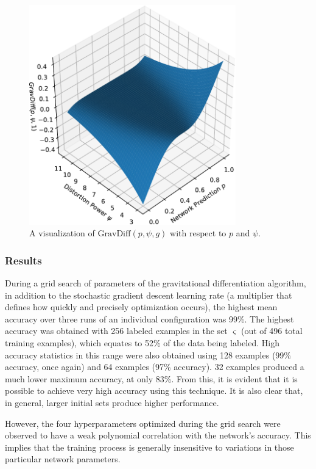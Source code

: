 \documentclass[10pt]{article}
\begin{document}
\begin{figure}[H]
    \centering
    \includegraphics[width=0.8\textwidth]{grav_diff}
    \caption{\label{grav_diff} A visualization of $\mathrm{GravDiff}(p, \psi, g)$ with respect to $p$ and $\psi$.}
\end{figure}

\subsubsection{Results}

During a grid search of parameters of the gravitational differentiation algorithm, in addition to the stochastic gradient descent learning rate (a multiplier that defines how quickly and precisely optimization occurs), the highest mean accuracy over three runs of an individual configuration was 99\%. The highest accuracy was obtained with 256 labeled examples in the set $\varsigma$ (out of 496 total training examples), which equates to 52\% of the data being labeled. High accuracy statistics in this range were also obtained using 128 examples (99\% accuracy, once again) and 64 examples (97\% accuracy). 32 examples produced a much lower maximum accuracy, at only 83\%. From this, it is evident that it is possible to achieve very high accuracy using this technique. It is also clear that, in general, larger initial sets produce higher performance.

However, the four hyperparameters optimized during the grid search were observed to have a weak polynomial correlation with the network's accuracy. This implies that the training process is generally insensitive to variations in those particular network parameters.
\end{document}
